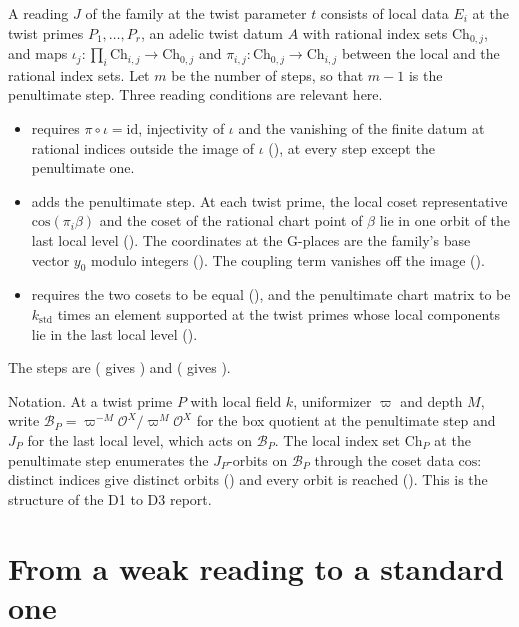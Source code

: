 \documentclass[11pt]{article}
\newcommand{\Ok}{\mathcal O}
\newcommand{\Bx}{\mathcal B}
\theoremstyle{remark}
\begin{document}
A reading $J$ of the family at the twist parameter $t$ consists of local data $E_i$ at the twist primes $P_1,\dots,P_r$, an adelic twist datum $A$ with rational index sets $\mathrm{Ch}_{0,j}$, and maps $\iota_j\colon\prod_i\mathrm{Ch}_{i,j}\to\mathrm{Ch}_{0,j}$ and $\pi_{i,j}\colon\mathrm{Ch}_{0,j}\to\mathrm{Ch}_{i,j}$ between the local and the rational index sets. Let $m$ be the number of steps, so that $m-1$ is the penultimate step. Three reading conditions are relevant here.
\begin{itemize}[leftmargin=*,itemsep=1pt]
\item {} requires $\pi\circ\iota=\mathrm{id}$, injectivity of $\iota$ and the vanishing of the finite datum at rational indices outside the image of $\iota$ (), at every step except the penultimate one.
\item {} adds the penultimate step. At each twist prime, the local coset representative $\mathrm{cos}(\pi_i\beta)$ and the coset of the rational chart point of $\beta$ lie in one orbit of the last local level (). The coordinates at the G-places are the family's base vector $y_0$ modulo integers (). The coupling term vanishes off the image ().
\item {} requires the two cosets to be equal (), and the penultimate chart matrix to be $k_{\mathrm{std}}$ times an element supported at the twist primes whose local components lie in the last local level ().
\end{itemize}
The steps are  ( gives ) and  ( gives ).

Notation. At a twist prime $P$ with local field $k$, uniformizer $\varpi$ and depth $M$, write $\Bx_P=\varpi^{-M}\Ok^{X}/\varpi^{M}\Ok^{X}$ for the box quotient at the penultimate step and $J_P$ for the last local level, which acts on $\Bx_P$. The local index set $\mathrm{Ch}_{P}$ at the penultimate step enumerates the $J_P$-orbits on $\Bx_P$ through the coset data $\mathrm{cos}$: distinct indices give distinct orbits () and every orbit is reached (). This is the structure  of the D1 to D3 report.

\section{From a weak reading to a standard one}
\end{document}
